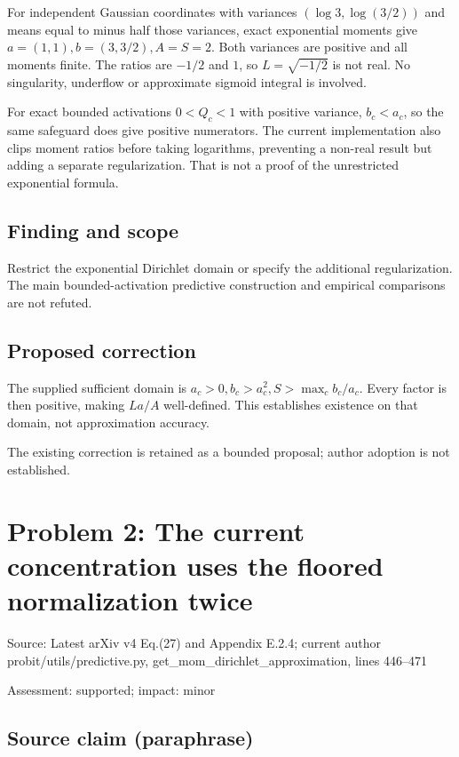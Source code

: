 \documentclass[11pt]{article}
\begin{document}
For independent Gaussian coordinates with variances \((\log3,\log(3/2))\) and means equal to minus half those variances, exact exponential moments give \(a=(1,1),b=(3,3/2),A=S=2\). Both variances are positive and all moments finite. The ratios are \(-1/2\) and \(1\), so \(L=\sqrt{-1/2}\) is not real. No singularity, underflow or approximate sigmoid integral is involved.

For exact bounded activations \(0<Q_c<1\) with positive variance, \(b_c<a_c\), so the same safeguard does give positive numerators. The current implementation also clips moment ratios before taking logarithms, preventing a non-real result but adding a separate regularization. That is not a proof of the unrestricted exponential formula.

\subsection*{Finding and scope}

Restrict the exponential Dirichlet domain or specify the additional regularization. The main bounded-activation predictive construction and empirical comparisons are not refuted.

\subsection*{Proposed correction}

The supplied sufficient domain is \(a_c>0,b_c>a_c^2,S>\max_cb_c/a_c\). Every factor is then positive, making \(La/A\) well-defined. This establishes existence on that domain, not approximation accuracy.

The existing correction is retained as a bounded proposal; author adoption is not established.

\section*{Problem 2: The current concentration uses the floored normalization twice}

Source: Latest arXiv v4 Eq.(27) and Appendix E.2.4; current author probit/utils/predictive.py, get\_mom\_dirichlet\_approximation, lines 446–471

Assessment: supported; impact: minor

\subsection*{Source claim (paraphrase)}
\end{document}
